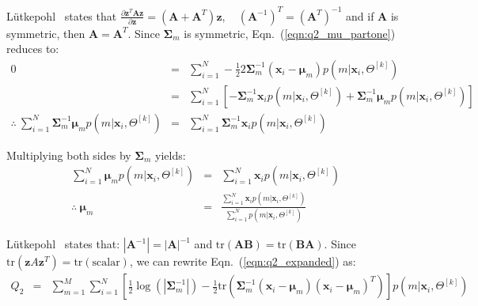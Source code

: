 \documentclass[10pt,a4paper]{article}
\def\Vec#1{{\boldsymbol{#1}}}
\def\Mat#1{{\boldsymbol{#1}}}
\begin{document}
\noindent
L\"{u}tkepohl~\cite{Lutkepohl96} states that
\mbox{$\frac{ \partial \Vec{z}^T \Mat{A} \Vec{z} }{ \partial \Vec{z} } =  (\Mat{A} + \Mat{A}^T)\Vec{z}$},
~ $(\Mat{A}^{-1})^T = (\Mat{A}^T)^{-1}$ and if $\Mat{A}$ is symmetric, then $\Mat{A} = \Mat{A}^T$.
Since $\Mat{\Sigma}_m$ is symmetric, Eqn.~(\ref{eqn:q2_mu_partone}) reduces to:
%
\begin{eqnarray}
	0 & = & \sum\nolimits_{i=1}^{N} - \frac{1}{2} 2 \Mat{\Sigma}_m^{-1} (\Vec{x}_i - \Vec{\mu}_m) p(m|\Vec{x}_i, \Theta^{[k]}) \\
	~ & = & \sum\nolimits_{i=1}^{N} \left[ - \Mat{\Sigma}_m^{-1} \Vec{x}_i p(m|\Vec{x}_i, \Theta^{[k]}) + \Mat{\Sigma}_m^{-1} \Vec{\mu}_m p(m|\Vec{x}_i, \Theta^{[k]})  \right] ~~~ \\
	\therefore ~ \sum\nolimits_{i=1}^{N} \Mat{\Sigma}_m^{-1} \Vec{\mu}_m p(m|\Vec{x}_i, \Theta^{[k]}) & = & \sum\nolimits_{i=1}^{N} \Mat{\Sigma}_m^{-1} \Vec{x}_i p(m|\Vec{x}_i, \Theta^{[k]}) 
\end{eqnarray}%

\noindent
Multiplying both sides by $\Mat{\Sigma}_m$ yields:
%
\begin{eqnarray}
	\sum\nolimits_{i=1}^{N} \Vec{\mu}_m p(m|\Vec{x}_i, \Theta^{[k]}) & = & \sum\nolimits_{i=1}^{N} \Vec{x}_i p(m|\Vec{x}_i, \Theta^{[k]})  \\
\therefore ~ \Vec{\mu}_m & = & \frac{ \sum\nolimits_{i=1}^{N} \Vec{x}_i p(m|\Vec{x}_i, \Theta^{[k]}) }
								   { \sum\nolimits_{i=1}^{N} p(m|\Vec{x}_i, \Theta^{[k]}) }
\end{eqnarray}

\noindent
L\"{u}tkepohl~\cite{Lutkepohl96} states that:  
$|\Mat{A}^{-1}| = |\Mat{A}|^{-1}$ 
and 
$\mbox{tr}(\Mat{A}\Mat{B}) = \mbox{tr}(\Mat{B}\Mat{A})$.
Since $\mbox{tr}{(\Vec{z}A\Vec{z}^T)} = \mbox{tr}(\mbox{scalar})$,
we can rewrite Eqn.~(\ref{eqn:q2_expanded}) as:
%
\begin{eqnarray}
	Q_2 & = &   \sum\nolimits_{m=1}^{M} \sum\nolimits_{i=1}^{N} \left[
					\frac{1}{2} \log(|\Mat{\Sigma}_m^{-1}|) - \frac{1}{2} \mbox{tr}(\Mat{\Sigma}_m^{-1} (\Vec{x}_i - \Vec{\mu}_m) (\Vec{x}_i - \Vec{\mu}_m)^T)
					\right] p(m|\Vec{x}_i, \Theta^{[k]})  \label{eqn:q2_rewritten}
\end{eqnarray}
\end{document}
